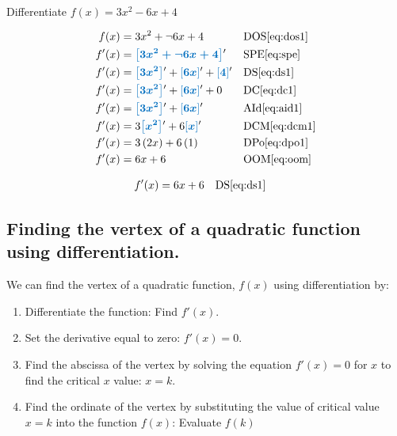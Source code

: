 \documentclass[20150903-160354-rs2.2-MarksMathNotebook.tex]{subfiles}
\begin{document}
\begin{example}[id:20141128-151834] \label{20141128-151834} \hfill \\

Differentiate $f(x)=3x^2-6x+4$

\soln

\solnsteps
\begin{align*}
f(x) &= 3x^2 + \neg 6x + 4 && \text{DOS} \eqref{eq:dos1} \\
f'(x) &= \farg{3x^2 + \neg 6x + 4}' && \text{SPE} \eqref{eq:spe} \\
f'(x) &= \farg{3x^2}' + \farg{6x}' + \farg{4}' && \text{DS} \eqref{eq:ds1} \\
f'(x) &= \farg{3x^2}' + \farg{6x}' + 0 && \text{DC} \eqref{eq:dc1} \\
f'(x) &= \farg{3x^2}' + \farg{6x}' && \text{AId} \eqref{eq:aid1} \\
f'(x) &= 3\farg{x^2}' + 6\farg{x}' && \text{DCM} \eqref{eq:dcm1} \\
f'(x) &= 3 \left(2x \right) + 6 \left(1\right) && \text{DPo} \eqref{eq:dpo1} \\
f'(x) &= 6x+6 && \text{OOM} \eqref{eq:oom}
\end{align*}

\soln
\lesssteps
\begin{align*}
f'(x) & = 6x+6 && \text{DS} \eqref{eq:ds1}
\end{align*}
\end{example}

\subsection{Finding the vertex of a quadratic function using differentiation.}

We can find the vertex of a quadratic function, $f(x)$ using differentiation by:

\begin{enumerate}
\item Differentiate the function: Find $f'(x)$.
\item Set the derivative equal to zero: $f'(x)=0$.
\item Find the abscissa of the vertex by solving the equation $f'(x)=0$ for $x$ to find the critical $x$ value: $x=k$.
\item Find the ordinate of the vertex by substituting the value of critical value $x=k$ into the function $f(x)$: Evaluate $f(k)$
\end{enumerate}
\end{document}
